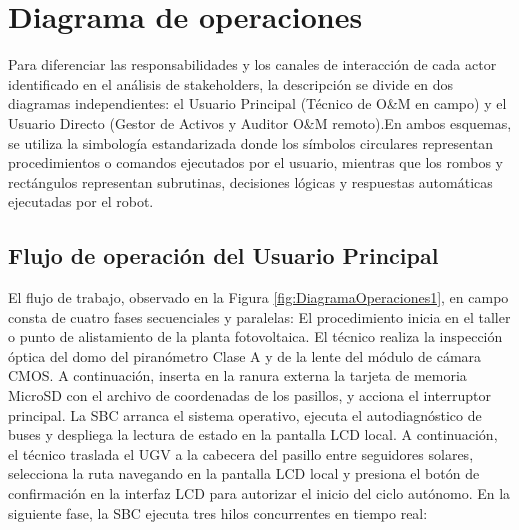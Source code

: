 \documentclass[../../General.tex]{subfiles}
\begin{document}
\section{Diagrama de operaciones}

    Para diferenciar las responsabilidades y los canales de interacción de cada actor identificado en el análisis de stakeholders, la descripción se divide en dos diagramas independientes: el Usuario Principal (Técnico de O\&M en campo) y el Usuario Directo (Gestor de Activos y Auditor O\&M remoto).En ambos esquemas, se utiliza la simbología estandarizada donde los símbolos circulares representan procedimientos o comandos ejecutados por el usuario, mientras que los rombos y rectángulos representan subrutinas, decisiones lógicas y respuestas automáticas ejecutadas por el robot.

    \subsection{Flujo de operación del Usuario Principal}

    El flujo de trabajo, observado en la Figura \ref{fig:DiagramaOperaciones1}, en campo consta de cuatro fases secuenciales y paralelas: El procedimiento inicia en el taller o punto de alistamiento de la planta fotovoltaica. El técnico realiza la inspección óptica del domo del piranómetro Clase A y de la lente del módulo de cámara CMOS. A continuación, inserta en la ranura externa la tarjeta de memoria MicroSD con el archivo de coordenadas de los pasillos, y acciona el interruptor principal. La SBC arranca el sistema operativo, ejecuta el autodiagnóstico de buses y despliega la lectura de estado en la pantalla LCD local. A continuación, el técnico traslada el UGV a la cabecera del pasillo entre seguidores solares, selecciona la ruta navegando en la pantalla LCD local y presiona el botón de confirmación en la interfaz LCD para autorizar el inicio del ciclo autónomo. En la siguiente fase, la SBC ejecuta tres hilos concurrentes en tiempo real:
\end{document}
